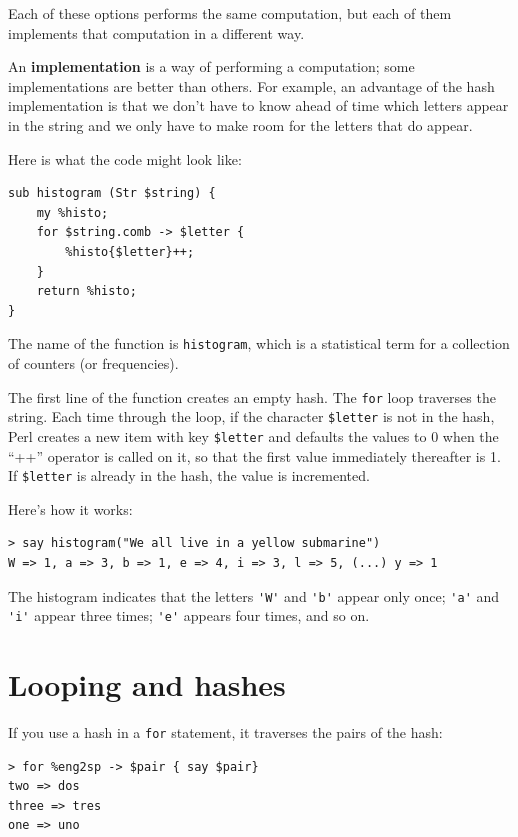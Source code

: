 Each of these options performs the same computation, but each
of them implements that computation in a different way.

An {\bf implementation} is a way of performing a computation;
some implementations are better than others.  For example,
an advantage of the hash implementation is that we don't
have to know ahead of time which letters appear in the string
and we only have to make room for the letters that do appear.

Here is what the code might look like:

\begin{verbatim}
sub histogram (Str $string) {
    my %histo;
    for $string.comb -> $letter {
        %histo{$letter}++;
    }
    return %histo;
}
\end{verbatim}
%
The name of the function is {\tt histogram}, which is a statistical
term for a collection of counters (or frequencies).

The first line of the
function creates an empty hash.  The {\tt for} loop traverses
the string.  Each time through the loop, if the character \verb'$letter' is
not in the hash, Perl creates a new item with key 
\verb'$letter' and defaults the values to 0 when the ``++'' 
operator is called on it, so that the first value immediately 
thereafter is 1.  If \verb'$letter'  is already in the hash,
the value is incremented.

Here's how it works:

\begin{verbatim}
> say histogram("We all live in a yellow submarine")
W => 1, a => 3, b => 1, e => 4, i => 3, l => 5, (...) y => 1
\end{verbatim}
%
The histogram indicates that the letters \verb"'W'" and \verb"'b'" appear only once; \verb"'a'" and \verb"'i'" appear three times; \verb"'e'" appears four times, and so on.

\section{Looping and hashes}

If you use a hash in a {\tt for} statement, it traverses
the pairs of the hash:

\begin{verbatim}
> for %eng2sp -> $pair { say $pair}
two => dos
three => tres
one => uno
\end{verbatim}
%

